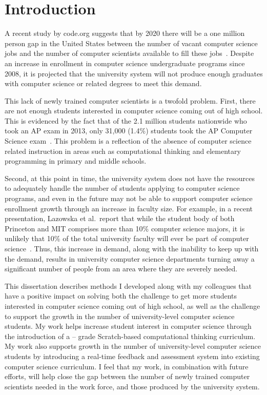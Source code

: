 \chapter{Introduction} \label{chap:introduction}
A recent study by code.org suggests that by 2020 there will be a one million
person gap in the United States between the number of vacant computer science
jobs and the number of computer scientists available to fill these
jobs~\cite{codeorg:2013}. Despite an increase in enrollment in computer science
undergraduate programs since 2008, it is projected that the university system
will not produce enough graduates with computer science or related degrees to
meet this demand.

This lack of newly trained computer scientists is a twofold problem. First,
there are not enough students interested in computer science coming out of high
school. This is evidenced by the fact that of the 2.1 million students
nationwide who took an AP exam in 2013, only 31,000 (1.4\%) students took the
AP Computer Science exam~\cite{cb:2013}. This problem is a reflection of the
absence of computer science related instruction in areas such as computational
thinking and elementary programming in primary and middle schools.

Second, at this point in time, the university system does not have the
resources to adequately handle the number of students applying to computer
science programs, and even in the future may not be able to support computer
science enrollment growth through an increase in faculty size. For example, in
a recent presentation, Lazowska et al.\ report that while the student body of
both Princeton and MIT comprises more than 10\% computer science majors, it is
unlikely that 10\% of the total university faculty will ever be part of
computer science~\cite{lazowska:2014}. Thus, this increase in demand, along
with the inability to keep up with the demand, results in university computer
science departments turning away a significant number of people from an area
where they are severely needed.

This dissertation describes methods I developed along with my colleagues that
have a positive impact on solving both the challenge to get more students
interested in computer science coming out of high school, as well as the
challenge to support the growth in the number of university-level computer
science students. My work helps increase student interest in computer science
through the introduction of a -- grade Scratch-based
computational thinking curriculum. My work also supports growth in the number
of university-level computer science students by introducing a real-time
feedback and assessment system into existing computer science curriculum.  I
feel that my work, in combination with future efforts, will help close the gap
between the number of newly trained computer scientists needed in the work
force, and those produced by the university system.

